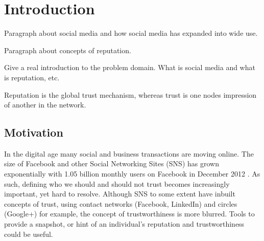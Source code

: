 \chapter{Introduction}\label{C:int}

Paragraph about social media and how social media has expanded into wide use.

Paragraph about concepts of reputation. 

Give a real introduction to the problem domain. What is social media and what is reputation, etc. 


Reputation is the global trust mechanism, whereas trust is one nodes impression of another in the network.









\section{Motivation}
In the digital age many social and business transactions are moving online. The size of Facebook and other Social Networking Sites (SNS) has grown exponentially with 1.05 billion monthly users on Facebook in December 2012 \cite{fb_users}. As such, defining who we should and should not trust becomes increasingly important, yet hard to resolve. Although SNS to some extent have inbuilt concepts of trust, using contact networks (Facebook, LinkedIn) and circles (Google+) for example, the concept of trustworthiness is more blurred. Tools to provide a snapshot, or hint of an individual's reputation and trustworthiness could be useful. 

